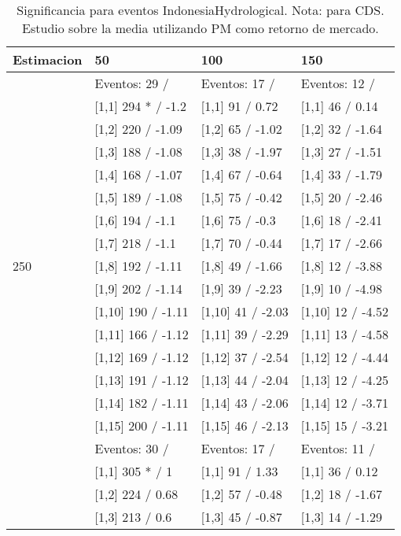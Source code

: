 \begin{table}

\caption{Significancia para eventos IndonesiaHydrological. Nota: para CDS. Estudio sobre la media utilizando PM como retorno de mercado.}
\centering
\begin{tabular}[t]{llll}
\toprule
Estimacion & 50 & 100 & 150\\
\midrule
 & Eventos:  29 / & Eventos:  17 / & Eventos:  12 /\\
 & {}[1,1] 294 * / -1.2 & {}[1,1] 91  / 0.72 & {}[1,1] 46  / 0.14\\
 & {}[1,2] 220  / -1.09 & {}[1,2] 65  / -1.02 & {}[1,2] 32  / -1.64\\
 & {}[1,3] 188  / -1.08 & {}[1,3] 38  / -1.97 & {}[1,3] 27  / -1.51\\
 & {}[1,4] 168  / -1.07 & {}[1,4] 67  / -0.64 & {}[1,4] 33  / -1.79\\
\addlinespace
 & {}[1,5] 189  / -1.08 & {}[1,5] 75  / -0.42 & {}[1,5] 20  / -2.46\\
 & {}[1,6] 194  / -1.1 & {}[1,6] 75  / -0.3 & {}[1,6] 18  / -2.41\\
 & {}[1,7] 218  / -1.1 & {}[1,7] 70  / -0.44 & {}[1,7] 17  / -2.66\\
250 & {}[1,8] 192  / -1.11 & {}[1,8] 49  / -1.66 & {}[1,8] 12  / -3.88\\
 & {}[1,9] 202  / -1.14 & {}[1,9] 39  / -2.23 & {}[1,9] 10  / -4.98\\
\addlinespace
 & {}[1,10] 190  / -1.11 & {}[1,10] 41  / -2.03 & {}[1,10] 12  / -4.52\\
 & {}[1,11] 166  / -1.12 & {}[1,11] 39  / -2.29 & {}[1,11] 13  / -4.58\\
 & {}[1,12] 169  / -1.12 & {}[1,12] 37  / -2.54 & {}[1,12] 12  / -4.44\\
 & {}[1,13] 191  / -1.12 & {}[1,13] 44  / -2.04 & {}[1,13] 12  / -4.25\\
 & {}[1,14] 182  / -1.11 & {}[1,14] 43  / -2.06 & {}[1,14] 12  / -3.71\\
\addlinespace
 & {}[1,15] 200  / -1.11 & {}[1,15] 46  / -2.13 & {}[1,15] 15  / -3.21\\
 & Eventos:  30 / & Eventos:  17 / & Eventos:  11 /\\
 & {}[1,1] 305 * / 1 & {}[1,1] 91  / 1.33 & {}[1,1] 36  / 0.12\\
 & {}[1,2] 224  / 0.68 & {}[1,2] 57  / -0.48 & {}[1,2] 18  / -1.67\\
 & {}[1,3] 213  / 0.6 & {}[1,3] 45  / -0.87 & {}[1,3] 14  / -1.29\\

\end{tabular}
\end{table}

